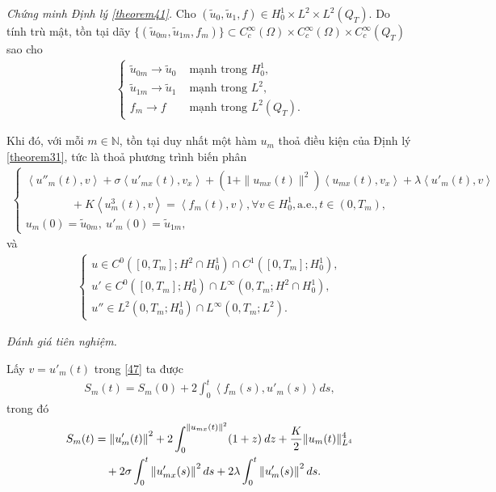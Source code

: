 \documentclass[12pt,a4paper]{article}
\def\N{\mathbb{N}}
\theoremstyle{definition}
\theoremstyle{definition}
\begin{document}
\textit{Chứng minh Định lý \ref{theorem41}.}
Cho $(\tilde{u}_0, \tilde{u}_1, f) \in H^1_0 \times L^2 \times L^2(Q_T)$. Do tính trù mật, tồn tại dãy $\{(\tilde{u}_{0m}, \tilde{u}_{1m}, f_m)\} \subset C_c^\infty(\Omega) \times C_c^\infty(\Omega) \times C_c^\infty(Q_T)$ sao cho
\begin{align} \label{46}
\begin{cases}
    \tilde{u}_{0m} \to \tilde{u}_0 &\text{ mạnh trong } H^1_0, \\
    \tilde{u}_{1m} \to \tilde{u}_1 &\text{ mạnh trong } L^2, \\
    f_m \to f &\text{ mạnh trong } L^2(Q_T).
\end{cases}
\end{align}

Khi đó, với mỗi $m \in \N$, tồn tại duy nhất một hàm $u_m$ thoả điều kiện của Định lý \ref{theorem31}, tức là thoả phương trình biến phân
\begin{align} \label{47}
\begin{cases}
    \left<u''_m(t),v\right>
    + \sigma \left<u'_{mx}(t),v_x\right>
    + \left(1 + \|u_{mx}(t)\|^2\right)\left<u_{mx}(t),v_x\right>
    + \lambda \left<u'_m(t),v\right> \\
    \quad \quad \quad \quad + K\left<u^3_m(t),v\right> = \left<f_m(t),v\right>, \forall v \in H^1_0, \text{a.e.}, t \in (0,T_m), \\
    u_m(0) = \tilde{u}_{0m},\: u'_m(0) = \tilde{u}_{1m},
\end{cases}
\end{align}
và
\begin{align} \label{48}
\begin{cases}
    u \in C^0([0,T_m]; H^2 \cap H^1_0) \cap C^1([0,T_m];H^1_0), \\
    u' \in C^0([0,T_m]; H^1_0) \cap L^\infty(0,T_m; H^2 \cap H^1_0),\\
    u'' \in L^2(0,T_m;H^1_0) \cap L^\infty(0,T_m; L^2).
\end{cases}
\end{align}

\textit{Đánh giá tiên nghiệm.}

Lấy $v = u'_m(t)$ trong \eqref{47} ta được
\begin{align}
    S_m(t) = S_m(0) + 2 \int_0^t \left<f_m(s), u'_m(s)\right> ds,
\end{align}
trong đó
\begin{align}
    S_m(t) &= \left\|u'_m(t)\right\|^2 + 2 \int_0^{\|u_{mx}(t)\|^2} (1+z)\:dz + \frac{K}{2} \|u_m(t)\|^4_{L^4} \\
    &\quad + 2 \sigma \int_0^t \left\|u'_{mx}(s)\right\|^2 ds + 2 \lambda \int_0^t \left\|u'_m(s)\right\|^2 ds. \notag
\end{align}
\end{document}
